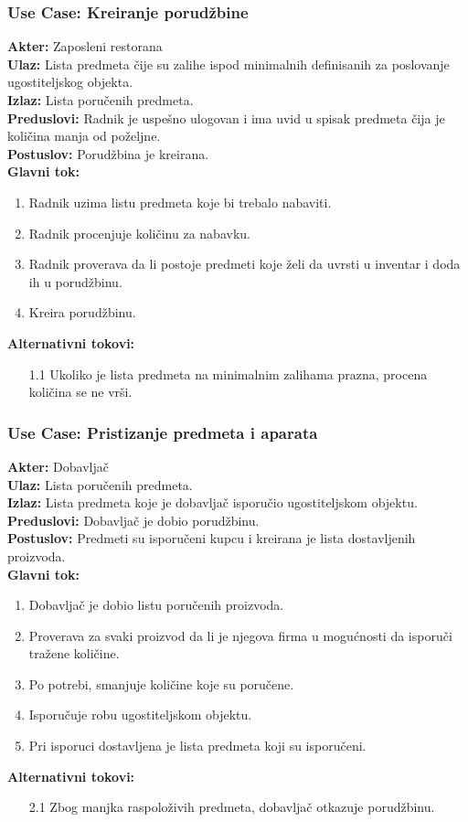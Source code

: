 \documentclass{article}
\begin{document}
\subsubsection{\textbf{Use Case}: Kreiranje porudžbine}
\textbf{Akter:} Zaposleni restorana\\
\textbf{Ulaz:} Lista predmeta čije su zalihe ispod minimalnih definisanih za poslovanje ugostiteljskog objekta.\\
\textbf{Izlaz:} Lista poručenih predmeta.\\
\textbf{Preduslovi:} Radnik je uspešno ulogovan i ima uvid u spisak predmeta čija je količina manja od poželjne.\\
\textbf{Postuslov:} Porudžbina je kreirana.\\
\textbf{Glavni tok:} 
\begin{enumerate}
	\item Radnik uzima listu predmeta koje bi trebalo nabaviti.
	\item Radnik procenjuje količinu za nabavku. 
	\item Radnik proverava da li postoje predmeti koje želi da uvrsti u inventar i doda ih u porudžbinu.
	\item Kreira porudžbinu.
\end{enumerate}
\textbf{Alternativni tokovi:} 
\begin{itemize}
\item [1.1] Ukoliko je lista predmeta na minimalnim zalihama prazna, procena količina se ne vrši.
\end{itemize}

\subsubsection{\textbf{Use Case}:  Pristizanje predmeta i aparata}
\textbf{Akter:} Dobavljač\\
\textbf{Ulaz:} Lista poručenih predmeta.\\
\textbf{Izlaz:} Lista predmeta koje je dobavljač isporučio ugostiteljskom objektu.\\
\textbf{Preduslovi:} Dobavljač je dobio porudžbinu.\\
\textbf{Postuslov:} Predmeti su isporučeni kupcu i kreirana je lista dostavljenih proizvoda.\\
\textbf{Glavni tok:} 
\begin{enumerate}
	\item Dobavljač je dobio listu poručenih proizvoda.
	\item Proverava za svaki proizvod da li je njegova firma u mogućnosti da isporuči tražene količine.
	\item Po potrebi, smanjuje količine koje su poručene.
	\item Isporučuje robu ugostiteljskom objektu.
	\item Pri isporuci dostavljena je lista predmeta koji su isporučeni.
\end{enumerate}
\textbf{Alternativni tokovi:} 
\begin{itemize}
\item [2.1] Zbog manjka raspoloživih predmeta, dobavljač otkazuje porudžbinu.
\end{itemize}
\end{document}
